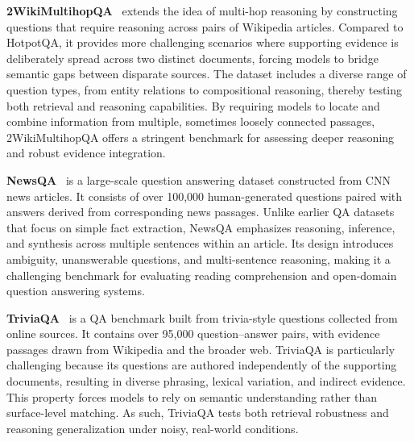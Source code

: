 \documentclass[11pt]{article}
\begin{document}
\noindent\textbf{2WikiMultihopQA}~\citep{ho20202wikimultihopqa} extends the idea of multi-hop reasoning by constructing questions that require reasoning across pairs of Wikipedia articles. Compared to HotpotQA, it provides more challenging scenarios where supporting evidence is deliberately spread across two distinct documents, forcing models to bridge semantic gaps between disparate sources. The dataset includes a diverse range of question types, from entity relations to compositional reasoning, thereby testing both retrieval and reasoning capabilities. By requiring models to locate and combine information from multiple, sometimes loosely connected passages, 2WikiMultihopQA offers a stringent benchmark for assessing deeper reasoning and robust evidence integration. 

\noindent\textbf{NewsQA}~\citep{trischler2017newsqa} is a large-scale question answering dataset constructed from CNN news articles. It consists of over 100,000 human-generated questions paired with answers derived from corresponding news passages. Unlike earlier QA datasets that focus on simple fact extraction, NewsQA emphasizes reasoning, inference, and synthesis across multiple sentences within an article. Its design introduces ambiguity, unanswerable questions, and multi-sentence reasoning, making it a challenging benchmark for evaluating reading comprehension and open-domain question answering systems. 

\noindent\textbf{TriviaQA}~\citep{joshi2017triviaqa} is a QA benchmark built from trivia-style questions collected from online sources. It contains over 95,000 question–answer pairs, with evidence passages drawn from Wikipedia and the broader web. TriviaQA is particularly challenging because its questions are authored independently of the supporting documents, resulting in diverse phrasing, lexical variation, and indirect evidence. This property forces models to rely on semantic understanding rather than surface-level matching. As such, TriviaQA tests both retrieval robustness and reasoning generalization under noisy, real-world conditions. 
\end{document}
